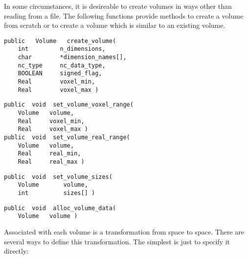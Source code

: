 In some circumstances, it is desireable to create volumes in ways
other than reading from a file.  The following functions provide
methods to create a volume from scratch or to create a volume which is
similar to an existing volume.

{\bf\begin{verbatim}
public   Volume   create_volume(
    int         n_dimensions,
    char        *dimension_names[],
    nc_type     nc_data_type,
    BOOLEAN     signed_flag,
    Real        voxel_min,
    Real        voxel_max )
\end{verbatim}}


{\bf\begin{verbatim}
public  void  set_volume_voxel_range(
    Volume   volume,
    Real     voxel_min,
    Real     voxel_max )
public  void  set_volume_real_range(
    Volume   volume,
    Real     real_min,
    Real     real_max )
\end{verbatim}}


{\bf\begin{verbatim}
public  void  set_volume_sizes(
    Volume       volume,
    int          sizes[] )
\end{verbatim}}


{\bf\begin{verbatim}
public  void  alloc_volume_data(
    Volume   volume )
\end{verbatim}}


Associated with each volume is a transformation from 
space to  space.  There are several ways to define this
transformation.  The simplest is just to specify it directly:

